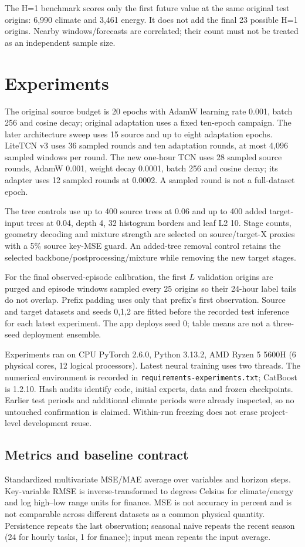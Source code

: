 The H=1 benchmark scores only the first future value at the same original test origins: 6,990 climate and 3,461 energy. It does not add the final 23 possible H=1 origins. Nearby windows/forecasts are correlated; their count must not be treated as an independent sample size.

\section{Experiments}\label{sec:exp}
The original source budget is 20 epochs with AdamW learning rate 0.001, batch 256 and cosine decay; original adaptation uses a fixed ten-epoch campaign. The later architecture sweep uses 15 source and up to eight adaptation epochs. LiteTCN v3 uses 36 sampled rounds and ten adaptation rounds, at most 4,096 sampled windows per round. The new one-hour TCN uses 28 sampled source rounds, AdamW 0.001, weight decay 0.0001, batch 256 and cosine decay; its adapter uses 12 sampled rounds at 0.0002. A sampled round is not a full-dataset epoch.

The tree controls use up to 400 source trees at 0.06 and up to 400 added target-input trees at 0.04, depth 4, 32 histogram borders and leaf L2 10. Stage counts, geometry decoding and mixture strength are selected on source/target-X proxies with a 5\% source key-MSE guard. An added-tree removal control retains the selected backbone/postprocessing/mixture while removing the new target stages.

For the final observed-episode calibration, the first $L$ validation origins are purged and episode windows sampled every 25 origins so their 24-hour label tails do not overlap. Prefix padding uses only that prefix's first observation. Source and target datasets and seeds 0,1,2 are fitted before the recorded test inference for each latest experiment. The app deploys seed 0; table means are not a three-seed deployment ensemble.

Experiments ran on CPU PyTorch 2.6.0, Python 3.13.2, AMD Ryzen 5 5600H (6 physical cores, 12 logical processors). Latest neural training uses two threads. The numerical environment is recorded in \texttt{requirements-experiments.txt}; CatBoost is 1.2.10. Hash audits identify code, initial experts, data and frozen checkpoints. Earlier test periods and additional climate periods were already inspected, so no untouched confirmation is claimed. Within-run freezing does not erase project-level development reuse.

\subsection{Metrics and baseline contract}
Standardized multivariate MSE/MAE average over variables and horizon steps. Key-variable RMSE is inverse-transformed to degrees Celsius for climate/energy and log high--low range units for finance. MSE is not accuracy in percent and is not comparable across different datasets as a common physical quantity. Persistence repeats the last observation; seasonal naive repeats the recent season (24 for hourly tasks, 1 for finance); input mean repeats the input average.

